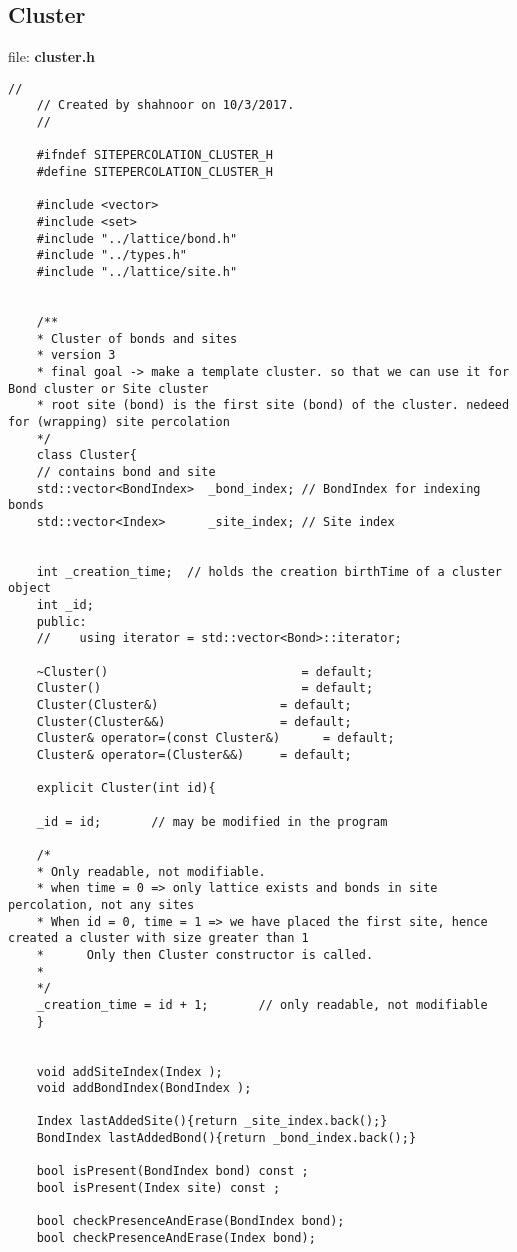 	\subsection{Cluster}
	file: \textbf{cluster.h}
	\begin{lstlisting}[style=CStyle]
	//
	// Created by shahnoor on 10/3/2017.
	//
	
	#ifndef SITEPERCOLATION_CLUSTER_H
	#define SITEPERCOLATION_CLUSTER_H
	
	#include <vector>
	#include <set>
	#include "../lattice/bond.h"
	#include "../types.h"
	#include "../lattice/site.h"
	
	
	/**
	* Cluster of bonds and sites
	* version 3
	* final goal -> make a template cluster. so that we can use it for Bond cluster or Site cluster
	* root site (bond) is the first site (bond) of the cluster. nedeed for (wrapping) site percolation
	*/
	class Cluster{
	// contains bond and site
	std::vector<BondIndex>  _bond_index; // BondIndex for indexing bonds
	std::vector<Index>      _site_index; // Site index
	
	
	int _creation_time;  // holds the creation birthTime of a cluster object
	int _id;
	public:
	//    using iterator = std::vector<Bond>::iterator;
	
	~Cluster()                           = default;
	Cluster()                            = default;
	Cluster(Cluster&)                 = default;
	Cluster(Cluster&&)                = default;
	Cluster& operator=(const Cluster&)      = default;
	Cluster& operator=(Cluster&&)     = default;
	
	explicit Cluster(int id){
	
	_id = id;       // may be modified in the program
	
	/*
	* Only readable, not modifiable.
	* when time = 0 => only lattice exists and bonds in site percolation, not any sites
	* When id = 0, time = 1 => we have placed the first site, hence created a cluster with size greater than 1
	*      Only then Cluster constructor is called.
	*
	*/
	_creation_time = id + 1;       // only readable, not modifiable
	}
	
	
	void addSiteIndex(Index );
	void addBondIndex(BondIndex );
	
	Index lastAddedSite(){return _site_index.back();}
	BondIndex lastAddedBond(){return _bond_index.back();}
	
	bool isPresent(BondIndex bond) const ;
	bool isPresent(Index site) const ;
	
	bool checkPresenceAndErase(BondIndex bond);
	bool checkPresenceAndErase(Index bond);
	

\end{lstlisting}
